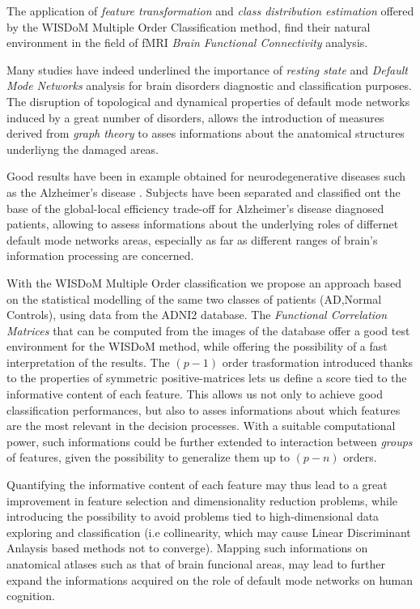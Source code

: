 \documentclass[12pt,openright,twoside,a4paper]{book}
\begin{document}
The application of \textit{feature transformation} and \textit{class distribution estimation} offered by the WISDoM Multiple Order Classification method, find their natural environment in the field of fMRI \textit{Brain Functional Connectivity} analysis.

Many studies have indeed underlined the importance of \textit{resting state} and \textit{Default Mode Networks} analysis for brain disorders diagnostic and classification purposes.
The disruption of topological and dynamical properties of default mode networks induced by a great number of disorders, allows the introduction of measures derived from \textit{graph theory} to asses informations about the anatomical structures underliyng the damaged areas.

Good results have been in example obtained for neurodegenerative diseases such as the Alzheimer's disease \cite{ssa}.
Subjects have been separated and classified ont the base of the global-local efficiency trade-off for Alzheimer's disease diagnosed patients, allowing to assess informations about the underlying roles of differnet default mode networks areas, especially as far as different ranges of brain's information processing are concerned.

With the WISDoM Multiple Order classification  we propose an approach based on the statistical modelling of the same two classes of patients (AD,Normal Controls), using data from the ADNI2 database. 
The \textit{Functional Correlation Matrices} that can be computed from the images of the database offer a good test environment for the WISDoM method, while offering the possibility of a fast interpretation of the results. 
The $(p-1)$ order trasformation introduced thanks to the properties of symmetric positive-matrices lets us define a score tied to the informative content of each feature.
This allows us not only to achieve good classification performances, but also to asses informations about which features are the most relevant in the decision processes.
With a suitable computational power, such informations could be further extended to interaction between \textit{groups} of features, given the possibility to generalize them up to $(p-n)$ orders.

Quantifying the informative content of each feature may thus lead to a great improvement in feature selection and dimensionality reduction problems, while introducing the possibility to avoid problems tied to high-dimensional data exploring and classification (i.e collinearity, which may cause Linear Discriminant Anlaysis based methods not to converge).
Mapping such informations on anatomical atlases  such as that of brain funcional areas, may lead to further expand the informations acquired on the role of default mode networks on human cognition.
\end{document}
